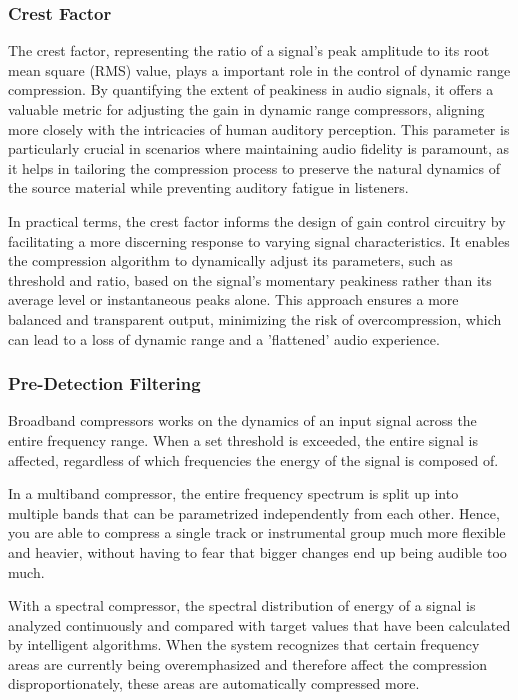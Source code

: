 \documentclass[10pt]{article}
\begin{document}
\begin{multicols*}{2}
                \subsubsection{Crest Factor}
                    The crest factor, representing the ratio of a signal's peak amplitude to its root mean square (RMS) value, plays a important role in the control of dynamic range compression. By quantifying the extent of peakiness in audio signals, it offers a valuable metric for adjusting the gain in dynamic range compressors, aligning more closely with the intricacies of human auditory perception. This parameter is particularly crucial in scenarios where maintaining audio fidelity is paramount, as it helps in tailoring the compression process to preserve the natural dynamics of the source material while preventing auditory fatigue in listeners.\par
                    In practical terms, the crest factor informs the design of gain control circuitry by facilitating a more discerning response to varying signal characteristics. It enables the compression algorithm to dynamically adjust its parameters, such as threshold and ratio, based on the signal's momentary peakiness rather than its average level or instantaneous peaks alone. This approach ensures a more balanced and transparent output, minimizing the risk of overcompression, which can lead to a loss of dynamic range and a 'flattened' audio experience.

                \subsubsection{Pre-Detection Filtering}
                    Broadband compressors works on the dynamics of an input signal across the entire frequency range. When a set threshold is exceeded, the entire signal is affected, regardless of which frequencies the energy of the signal is composed of.\par
                    In a multiband compressor, the entire frequency spectrum is split up into multiple bands that can be parametrized independently from each other. Hence, you are able to compress a single track or instrumental group much more flexible and heavier, without having to fear that bigger changes end up being audible too much.\par
                    With a spectral compressor, the spectral distribution of energy of a signal is analyzed continuously and compared with target values that have been calculated by intelligent algorithms. When the system recognizes that certain frequency areas are currently being overemphasized and therefore affect the compression disproportionately, these areas are automatically compressed more.


\end{multicols*}
\end{document}
